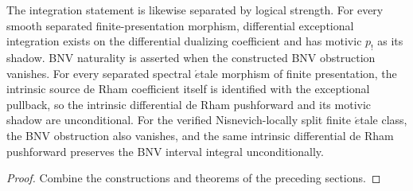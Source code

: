 \begin{theorem}
The integration statement is likewise separated by logical strength.  For every smooth separated
finite-presentation morphism, differential exceptional integration exists on the differential
dualizing coefficient and has motivic \(p_!\) as its shadow.  BNV naturality is asserted when the
constructed BNV obstruction vanishes.  For every separated spectral \(\acute{e}\)tale morphism of
finite presentation, the intrinsic source de Rham coefficient itself is identified with the
exceptional pullback, so the intrinsic differential de Rham pushforward and its motivic shadow are
unconditional.  For the verified Nisnevich-locally split finite \(\acute{e}\)tale class, the BNV
obstruction also vanishes, and the same intrinsic differential de Rham pushforward preserves the BNV
interval integral unconditionally.
\end{theorem}

\begin{proof}
Combine the constructions and theorems of the preceding sections.
\end{proof}
